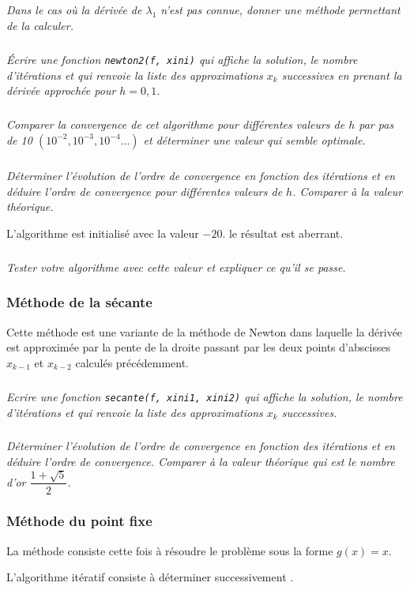 \documentclass[10pt]{article}
\begin{document}
\subparagraph{}\textit{Dans le cas où la dérivée de $\lambda_1$ n'est pas connue, donner une méthode permettant de la calculer. }


\subparagraph{}\textit{Écrire une fonction \texttt{newton2(f, xini)} qui affiche la solution, le nombre d'itérations et qui renvoie la liste des approximations $x_k$ successives en prenant la dérivée approchée pour $h={0,1}$.}

\subparagraph{}\textit{Comparer la convergence de cet algorithme pour différentes valeurs de $h$ par pas de 10 $(10^{-2}, 10^{-3}, 10^{-4}...)$ et déterminer une valeur qui semble optimale.}

\subparagraph{}\textit{Déterminer l'évolution de l'ordre de convergence en fonction des itérations et en déduire l'ordre de convergence pour différentes valeurs de $h$. Comparer à la valeur théorique.}

L'algorithme est initialisé avec la valeur $-20$. le résultat est aberrant.

\subparagraph{}\textit{Tester votre algorithme avec cette valeur et expliquer ce qu'il se passe.}


\subsubsection{Méthode de la sécante}
Cette méthode est une variante de la méthode de Newton dans laquelle la dérivée est approximée par la pente de la droite passant par les deux points d'abscisses $x_{k-1}$ et $x_{k-2}$ calculés précédemment.


\subparagraph{}\textit{Ecrire une fonction \texttt{secante(f, xini1, xini2)} qui affiche la solution, le nombre d'itérations et qui renvoie la liste des approximations $x_k$ successives.}

\subparagraph{}\textit{Déterminer l'évolution de l'ordre de convergence en fonction des itérations et en déduire l'ordre de convergence. Comparer à la valeur théorique qui est le nombre d'or $\dfrac{1+\sqrt{5}}{2}$.}

\subsubsection{Méthode du point fixe}
La méthode consiste cette fois à résoudre le problème sous la forme $g(x)=x$.

L'algorithme itératif consiste à déterminer successivement .
\end{document}
